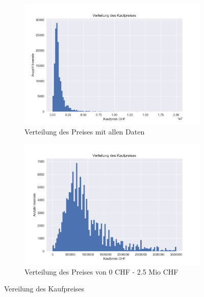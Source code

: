 \begin{figure}[ht]
\begin{subfigure}{.5\textwidth}
  \centering
  \includegraphics[width=\linewidth]{images/bar_des_kauf_preises.png}
  \caption[Verteilung des Preises mit allen Daten]{Verteilung des Preises mit allen Daten}
  \label{fig:verteilung_price_all}
\end{subfigure}%
\begin{subfigure}{.5\textwidth}
  \centering
  \includegraphics[width=\linewidth]{images/bar_des_kauf_preises_cut.png}
  \caption[Verteilung des Preises von 0 CHF - 2.5 Mio CHF]{Verteilung des Preises von 0 CHF - 2.5 Mio CHF}
  \label{fig:verteilung_price_part}
\end{subfigure}
\caption[Vereilung des Kaufpreises]{Vereilung des Kaufpreises}
\label{fig:price}
\end{figure}
